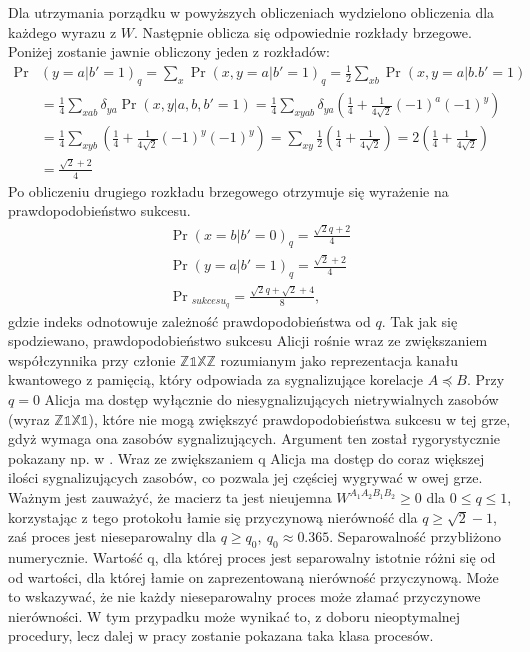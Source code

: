 \documentclass[10pt]{article} %
\newcommand{\WAll}{W^{A_1A_2B_1B_2}}
\newcommand{\X}{\mathbb{X}}
\newcommand{\Z}{\mathbb{Z}}
\newcommand{\I}{\mathbb{1}}
\begin{document}
Dla utrzymania porządku w powyższych obliczeniach wydzielono obliczenia dla każdego wyrazu z $W$.
Następnie oblicza się odpowiednie rozkłady brzegowe. Poniżej zostanie jawnie obliczony jeden z rozkładów:
\begin{equation}
\begin{split}
\Pr&(y=a|b'=1)_q = \sum_x \Pr(x, y=a|b'=1)_q = \frac{1}{2} \sum_{xb} \Pr(x, y=a|b. b'=1) \\&= \frac{1}{4}\sum_{xab} \delta_{ya} \Pr(x,y|a,b,b'=1)
= \frac{1}{4}\sum_{xyab} \delta_{ya} \left( \frac{1}{4}+\frac{1}{4\sqrt{2}} (-1)^a (-1)^y \right) \\&=  \frac{1}{4}\sum_{xyb} \left( \frac{1}{4}+\frac{1}{4\sqrt{2}} (-1)^y (-1)^y \right) = \sum_{xy} \frac{1}{2} \left( \frac{1}{4}+\frac{1}{4\sqrt{2}} \right) = 2\left(\frac{1}{4} + \frac{1}{4\sqrt{2}}\right) \\
&= \frac{\sqrt{2}+2}{4}
\end{split}
\end{equation}
Po obliczeniu drugiego rozkładu brzegowego otrzymuje się wyrażenie na prawdopodobieństwo sukcesu.
\begin{gather}
\Pr(x=b|b'=0)_q = \frac{\sqrt{2}q+2}{4} \\
\Pr(y=a|b'=1)_q = \frac{\sqrt{2}+2}{4} \\ 
\Pr{}_{sukcesu_q} = \frac{\sqrt{2}q + \sqrt{2} + 4}{8},
\end{gather}
gdzie indeks odnotowuje zależność prawdopodobieństwa od $q$. Tak jak się spodziewano, prawdopodobieństwo sukcesu Alicji rośnie wraz ze zwiększaniem współczynnika przy członie $\Z\I\X\Z$ rozumianym jako reprezentacja kanału kwantowego z pamięcią, który odpowiada za sygnalizujące korelacje $A \preceq B$.
Przy $q = 0$ Alicja ma dostęp wyłącznie do niesygnalizujących nietrywialnych zasobów (wyraz $\Z\I\X\I$), które nie mogą zwiększyć prawdopodobieństwa sukcesu w tej grze, gdyż wymaga ona zasobów sygnalizujących. Argument ten został rygorystycznie pokazany np. w \cite{mp_gyni}. Wraz ze zwiększaniem q Alicja ma dostęp do coraz
większej ilości sygnalizujących zasobów, co pozwala jej częściej wygrywać w owej grze. Ważnym jest zauważyć, że macierz ta jest nieujemna $\WAll \geq 0$ dla $0 \leq q \leq 1$, korzystając z tego protokołu łamie się przyczynową nierówność dla $q \geq \sqrt{2} - 1$, zaś proces jest nieseparowalny dla $q \geq q_0,~q_0 \approx 0.365$.
Separowalność przybliżono numerycznie. Wartość q, dla której proces jest separowalny istotnie różni się od od wartości, dla której łamie on zaprezentowaną nierówność przyczynową. Może to wskazywać, że nie każdy nieseparowalny proces może złamać przyczynowe nierówności. W tym przypadku może wynikać to, z doboru nieoptymalnej procedury, lecz dalej w pracy zostanie pokazana taka klasa procesów.
\end{document}
